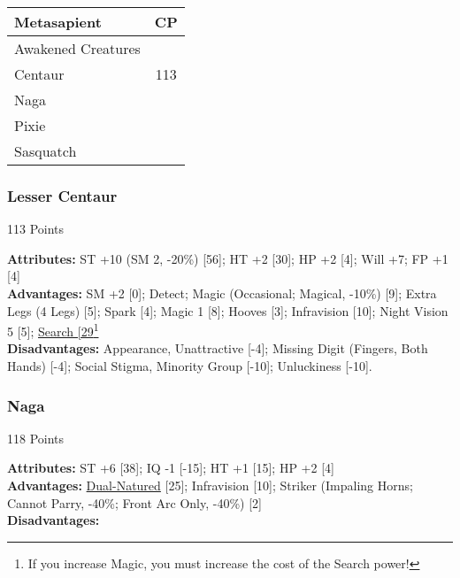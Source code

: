 \begin{multicols*}{3}
	\begin{center}
		\begin{tabularx}{0.32\textwidth}{|X|c|}
			\hline
			Metasapient & CP \\
			\hline
			\hline
			Awakened Creatures & \\
			\hline
			Centaur & 113 \\
			Naga & \\
			Pixie & \\
			Sasquatch & \\
			\hline
		\end{tabularx}
	\end{center}
	
	\subsubsection*{Lesser Centaur}
	\begin{flushright}
		113 Points
	\end{flushright}
	\textbf{Attributes:}
	ST +10 (SM 2, -20\%) [56]; HT +2 [30]; HP +2 [4]; Will +7; FP +1 [4]
	\\\textbf{Advantages:}
	SM +2 [0]; Detect; Magic (Occasional; Magical, -10\%) [9]; Extra Legs (4 Legs) [5]; Spark [4]; Magic 1 [8]; Hooves [3]; Infravision [10]; Night Vision 5 [5]; \hyperref[search]{Search [29}\footnote{If you increase Magic, you must increase the cost of the Search power!}
	\\\textbf{Disadvantages:} 
	Appearance, Unattractive [-4]; Missing Digit (Fingers, Both Hands) [-4]; Social Stigma, Minority Group [-10]; Unluckiness [-10].
	
	\subsubsection*{Naga}
	\begin{flushright}
		118 Points
	\end{flushright}
	\textbf{Attributes:} 
	ST +6 [38]; IQ -1 [-15]; HT +1 [15]; HP +2 [4]
	\\\textbf{Advantages:} 
	\hyperref[dual_natured]{Dual-Natured} [25]; Infravision [10]; Striker (Impaling Horns; Cannot Parry, -40\%; Front Arc Only, -40\%) [2]
	\\\textbf{Disadvantages:} 
	

\end{multicols*}
